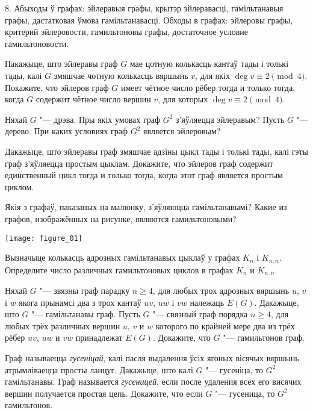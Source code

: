 \documentclass[12pt, a4paper]{article}
\begin{document}
\biLangHeader
{8. Абыходы ў графах: эйлеравыя графы, крытэр эйлеравасці, гамільтанавыя графы, дастатковая ўмова гамільтанавасці.}
{Обходы в графах: эйлеровы графы, критерий эйлеровости, гамильтоновы графы, достаточное условие гамильтоновости.}

\begin{problemList}

\problemItemSimple
{Пакажыце, што эйлеравы граф $G$ мае цотную колькасць кантаў тады і толькі тады,
калі $G$ змяшчае чотную колькасць вяршынь $v$, для якіх $\deg v \equiv 2\pmod{4}$.}
{Покажите, что эйлеров граф $G$ имеет чётное число рёбер тогда и только тогда,
когда $G$ содержит чётное число вершин $v$, для которых $\deg v \equiv 2\pmod{4}$.}

\bigskip

\problemItemSimple
{Няхай $G$ "--- дрэва. Пры якіх умовах граф $G^2$ з'яўляецца эйлеравым?}
{Пусть $G$ "--- дерево. При каких условиях граф $G^2$ является эйлеровым?}

\bigskip

\problemItemSimple
{Дакажыце, што эйлеравы граф змяшчае адзіны цыкл тады і толькі тады,
калі гэты граф з'яўляецца простым цыклам.}
{Докажите, что эйлеров граф содержит единственный цикл тогда и только тогда,
когда этот граф является простым циклом.}

\bigskip

\problemItemWithCommonPart
{Якія з графаў, паказаных на малюнку, з'яўляюцца гамільтанавымі?}
{Какие из графов, изображённых на рисунке, являются гамильтоновыми?}
{%
\begin{center}
    \texttt{[image: figure\_01]}
\end{center}
}

\problemItemSimple
{Вызначыце колькасць адрозных гамільтанавых цыклаў у графах $K_n$ і $K_{n, n}$.}
{Определите число различных гамильтоновых циклов в графах $K_n$ и $K_{n, n}$.}

\bigskip

\problemItemSimple
{Няхай $G$ "--- звязны граф парадку $n\ge 4$, для любых трох адрозных вяршынь $u$, $v$ і $w$
якога прынамсі два з трох кантаў $uv$, $uw$ і $vw$ належаць $E(G)$.
Дакажыце, што $G$ "--- гамільтанавы граф.}
{Пусть $G$ "--- связный граф порядка $n\ge 4$, для любых трёх различных вершин $u$, $v$ и $w$
которого по крайней мере два из трёх рёбер $uv$, $uw$ и $vw$ принадлежат $E(G)$.
Докажите, что $G$ "--- гамильтонов граф.}

\bigskip

\problemItemSimple
{Граф называецца \textit{гусеніцай}, калі пасля выдалення ўсіх ягоных вісячых вяршынь атрымліваецца просты ланцуг.
Дакажыце, што калі $G$ "--- гусеніца, то $G^2$ гамільтанавы.}
{Граф называется \textit{гусеницей}, если после удаления всех его висячих вершин получается простая цепь.
Докажите, что если $G$ "--- гусеница, то $G^2$ гамильтонов.}


\end{problemList}
\end{document}
